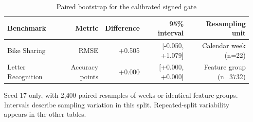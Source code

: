 \begin{table}[t]
\centering
\small
\caption{Paired bootstrap for the calibrated signed gate}
\label{tab:paired_bootstrap}
\begin{tabular}{@{}lrrrr@{}}
\toprule
\textbf{Benchmark} & \textbf{Metric} & \textbf{Difference} & \textbf{95\% interval} & \textbf{Resampling unit} \\
\midrule
Bike Sharing & RMSE & +0.505 & [-0.050, +1.079] & Calendar week (n=22) \\
Letter Recognition & Accuracy points & +0.000 & [+0.000, +0.000] & Feature group (n=3732) \\
\bottomrule
\end{tabular}
\par\medskip
\begin{minipage}{0.98\linewidth}\footnotesize Seed 17 only, with 2,400 paired resamples of weeks or identical-feature groups. Intervals describe sampling variation in this split. Repeated-split variability appears in the other tables.\end{minipage}
\end{table}
